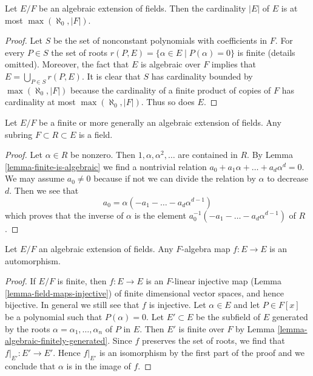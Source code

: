 \begin{lemma}
\label{lemma-size-algebraic-extension}
Let $E/F$ be an algebraic extension of fields. Then the cardinality $|E|$
of $E$ is at most $\max(\aleph_0, |F|)$.
\end{lemma}

\begin{proof}
Let $S$ be the set of nonconstant polynomials with coefficients in $F$.
For every $P \in S$ the set of roots
$r(P, E) = \{\alpha \in E \mid P(\alpha) = 0\}$
is finite (details omitted). Moreover, the fact that $E$ is algebraic
over $F$ implies that $E = \bigcup_{P \in S} r(P, E)$.
It is clear that $S$ has cardinality bounded by $\max(\aleph_0, |F|)$
because the cardinality of a finite product of copies of $F$ has
cardinality at most $\max(\aleph_0, |F|)$.
Thus so does $E$.
\end{proof}

\begin{lemma}
\label{lemma-subalgebra-algebraic-extension-field}
Let $E/F$ be a finite or more generally an algebraic extension of fields.
Any subring $F \subset R \subset E$ is a field.
\end{lemma}

\begin{proof}
Let $\alpha \in R$ be nonzero. Then $1, \alpha, \alpha^2, \ldots$
are contained in $R$. By Lemma \ref{lemma-finite-is-algebraic}
we find a nontrivial relation
$a_0 + a_1 \alpha + \ldots + a_d \alpha^d = 0$.
We may assume $a_0 \not = 0$ because if not we can divide the relation
by $\alpha$ to decrease $d$. Then we see that
$$
a_0 = \alpha (- a_1  - \ldots - a_d \alpha^{d - 1})
$$
which proves that the inverse of $\alpha$ is the element
$a_0^{-1} (- a_1  - \ldots - a_d \alpha^{d - 1})$
of $R$.
\end{proof}

\begin{lemma}
\label{lemma-algebraic-extension-self-map}
Let $E/F$ an algebraic extension of fields. Any $F$-algebra map
$f : E \to E$ is an automorphism.
\end{lemma}

\begin{proof}
If $E/F$ is finite, then $f : E \to E$ is an $F$-linear 
injective map (Lemma \ref{lemma-field-maps-injective})
of finite dimensional vector spaces, and hence bijective.
In general we still see that $f$ is injective.
Let $\alpha \in E$ and let $P \in F[x]$ be a
polynomial such that $P(\alpha) = 0$.
Let $E' \subset E$ be the subfield of $E$ generated
by the roots $\alpha = \alpha_1, \ldots, \alpha_n$ of $P$ in $E$.
Then $E'$ is finite over $F$ by Lemma \ref{lemma-algebraic-finitely-generated}.
Since $f$ preserves the set of roots, we find that
$f|_{E'} : E' \to E'$. Hence $f|_{E'}$ is an isomorphism
by the first part of the proof and we conclude that $\alpha$
is in the image of $f$.
\end{proof}






